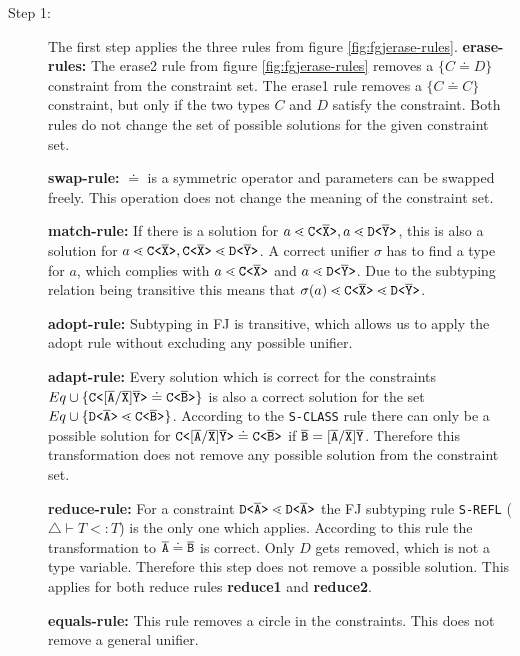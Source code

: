 \begin{description}
\item[Step 1:]
The first step applies the three rules from figure \ref{fig:fgjerase-rules}.
\textbf{erase-rules:} The erase2 rule from figure \ref{fig:fgjerase-rules} removes a
$\{C \doteq D\}$ constraint from the constraint set.
The erase1 rule removes a $\{C \doteq C\}$ constraint,
but only if the two types $C$ and $D$ satisfy the constraint.
Both rules do not change the set of possible solutions for the given constraint
set.

\textbf{swap-rule:} $\doteq$ is a symmetric operator and parameters can be swapped freely.
This operation does not change the meaning of the constraint set.

\textbf{match-rule:}
If there is a solution for $a \lessdot \mathtt{C \texttt{<} \overline{\tt X} \texttt{>} }, a \lessdot \mathtt{D \texttt{<} \overline{\tt Y} \texttt{>} }$,
this is also a solution for $a \lessdot \mathtt{C \texttt{<} \overline{\tt X} \texttt{>} }, \mathtt{C \texttt{<} \overline{\tt X} \texttt{>} } \lessdot \mathtt{D \texttt{<} \overline{\tt Y} \texttt{>} }$.
A correct unifier $\sigma$ has to find a type for $a$, which complies with $a \lessdot \mathtt{C \texttt{<} \overline{\tt X} \texttt{>} }$ and $a \lessdot \mathtt{D \texttt{<} \overline{\tt Y} \texttt{>} }$.
Due to the subtyping relation being transitive this means that $\sigma(a) \lessdot \mathtt{C \texttt{<} \overline{\tt X} \texttt{>} } \lessdot \mathtt{D \texttt{<} \overline{\tt Y} \texttt{>} }$.

\textbf{adopt-rule:} Subtyping in FJ is transitive,
which allows us to apply the adopt rule without excluding any possible unifier.

\textbf{adapt-rule:} Every solution which is correct for the constraints
$Eq \cup \{  \mathtt{C \texttt{<} [\overline{\tt A}/\overline{\tt X}]\overline{\tt Y} \texttt{>} } \doteq \mathtt{C \texttt{<} \overline{\tt B} \texttt{>} } \}$ is also
a correct solution for the set $Eq \cup \{  \mathtt{D \texttt{<} \overline{\tt A} \texttt{>} } \lessdot \mathtt{C \texttt{<} \overline{\tt B} \texttt{>} } \}$.
According to the \texttt{S-CLASS} rule there can only be a possible solution for 
$\mathtt{C \texttt{<} [\overline{\tt A}/\overline{\tt X}]\overline{\tt Y} \texttt{>} } \doteq \mathtt{C \texttt{<} \overline{\tt B} \texttt{>} }$
if $\overline{\tt B} = [\overline{\tt A}/\overline{\tt X}]\overline{\tt Y}$.
Therefore this transformation does not remove any possible solution from the constraint set.

\textbf{reduce-rule:}
For a constraint $\mathtt{D \texttt{<} \overline{\tt A} \texttt{>} } \lessdot \mathtt{D \texttt{<} \overline{\tt A} \texttt{>} }$ the FJ subtyping rule \texttt{S-REFL} ($\triangle \vdash T <: T$) is the only one which applies.
According to this rule the transformation to $\overline{\tt A} \doteq \overline{\tt B}$ is correct.
Only $D$ gets removed, which is not a type variable.
Therefore this step does not remove a possible solution.
This applies for both reduce rules \textbf{reduce1} and \textbf{reduce2}.

\textbf{equals-rule:}
This rule removes a circle in the constraints.
This does not remove a general unifier.


\end{description}
